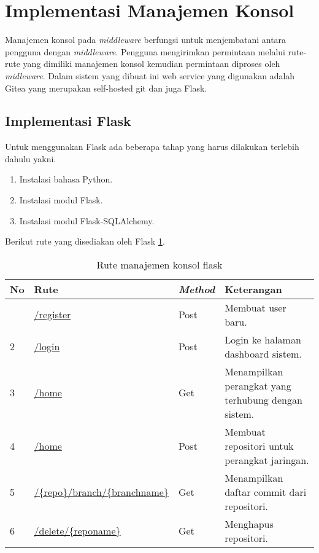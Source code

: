    	\section{Implementasi Manajemen Konsol}
   		Manajemen konsol pada \textit{middleware} berfungsi untuk menjembatani antara pengguna dengan \textit{middleware}. Pengguna mengirimkan permintaan melalui rute-rute yang dimiliki manajemen konsol kemudian permintaan diproses oleh \textit{midleware}. Dalam sistem yang dibuat ini web service yang digunakan adalah Gitea yang merupakan self-hosted git dan juga Flask. 
   		
   		\subsection{Implementasi Flask}
   		Untuk menggunakan Flask ada beberapa tahap yang harus dilakukan terlebih dahulu yakni. 
   		\begin{enumerate}
   			\item Instalasi bahasa Python.
   			\item Instalasi modul Flask.
   			\item Instalasi modul Flask-SQLAlchemy.
   		\end{enumerate}
   		
   		Berikut rute yang disediakan oleh Flask \ref{tabelRuteFlaskApi}.
   		\begin{longtable}{|p{}|p{}|p{}|p{}|}
   			
   			\caption{Rute manajemen konsol flask} \label{tabelRuteFlaskApi} \\
   			\hline
   			\textbf{No} & \textbf{Rute} & \textbf{\textit{Method}} & \textbf{Keterangan} \\ \hline
   			\endfirsthead
   		
   		
   		
   			\endhead
   			\endfoot
   			\endlastfoot
   			1 & \url{/register} & Post & Membuat user baru. \\ \hline
   			2 & \url{/login} & Post & Login ke halaman dashboard sistem. \\ \hline
   			3 & \url{/home} & Get & Menampilkan perangkat yang terhubung dengan sistem. \\ \hline
   			4 & \url{/home} & Post & Membuat repositori untuk perangkat jaringan. \\ \hline	
   			5 & \url{/{repo}/branch/{branchname}} & Get & Menampilkan daftar commit dari repositori.\\ \hline	
   			6 & \url{/delete/{reponame}} & Get & Menghapus repositori.\\ \hline
   			
   		\end{longtable}
   		
